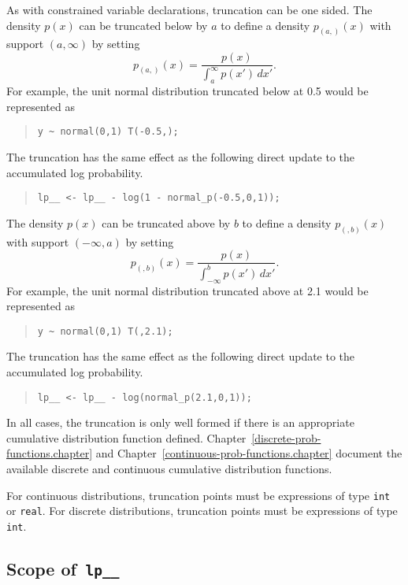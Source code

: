 \documentclass[10pt]{report}
\newcommand{\code}[1]{{\tt #1}}
\newcommand{\refchapter}[1]{Chapter~\ref{#1.chapter}}
\begin{document}
As with constrained variable declarations, truncation can be one
sided.  The density $p(x)$ can be truncated below by $a$ to define a
density $p_{(a,)}(x)$ with support $(a,\infty)$ by setting
%
\[
p_{(a,)}(x) = \frac{p(x)}
                 {\int_a^{\infty} p(x') \, dx'}.
\]
For example, the unit normal distribution truncated below at 0.5 would
be represented as
%
\begin{quote}
\begin{Verbatim} 
y ~ normal(0,1) T(-0.5,);
\end{Verbatim}
\end{quote}
% 
The truncation has the same effect as the following direct update to
the accumulated log probability.
%
\begin{quote}
\begin{Verbatim}
lp__ <- lp__ - log(1 - normal_p(-0.5,0,1));
\end{Verbatim}
\end{quote}

The density $p(x)$ can be truncated above by $b$ to define a density
$p_{(,b)}(x)$ with support $(-\infty,a)$ by setting
\[
p_{(,b)}(x) = \frac{p(x)}
                    {\int_{-\infty}^b p(x') \, dx'}.
\]
For example, the unit normal distribution truncated above at 2.1 would
be represented as
%
\begin{quote}
\begin{Verbatim} 
y ~ normal(0,1) T(,2.1);
\end{Verbatim}
\end{quote}
% 
The truncation has the same effect as the following direct update to
the accumulated log probability.
%
\begin{quote}
\begin{Verbatim}
lp__ <- lp__ - log(normal_p(2.1,0,1));
\end{Verbatim}
\end{quote}

In all cases, the truncation is only well formed if there is an
appropriate cumulative distribution function defined.
\refchapter{discrete-prob-functions} and
\refchapter{continuous-prob-functions} document the available discrete
and continuous cumulative distribution functions.

For continuous distributions, truncation points must be expressions of
type \code{int} or \code{real}.  For discrete distributions, truncation
points must be expressions of type \code{int}.


\subsection{Scope of\, \code{lp\_\_}}
\end{document}
